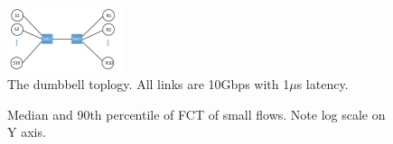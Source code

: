 \begin{figure}[t]
\center
\includegraphics[width=0.3\textwidth]{figures/dumbbell.pdf}
\caption{The dumbbell toplogy. All links are 10Gbps with 1$\mu$s latency.}
\label{fig:fct_topo}
\end{figure}

\begin{figure}[t]
\center
{}
\caption{Median and 90th percentile of FCT of small flows. Note log scale on Y axis.}
\label{fig:fct_results}
\end{figure}
\fi


